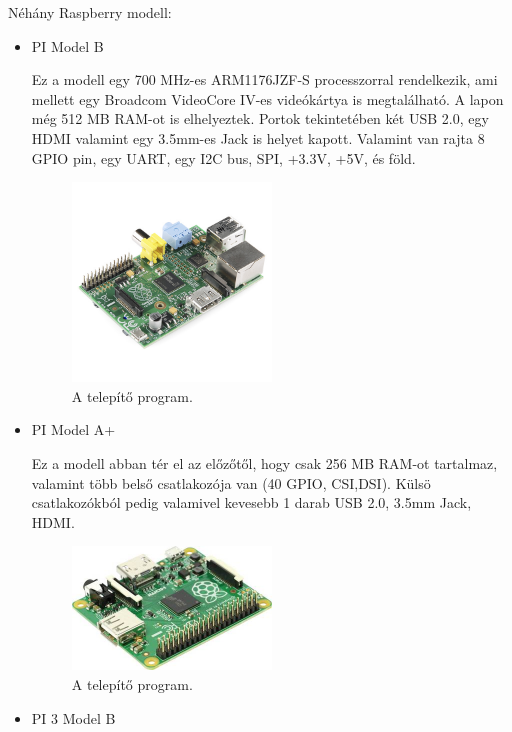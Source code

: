 \documentclass[a4paper,12pt,oneside]{report}
\begin{document}
Néhány Raspberry modell:
\begin{itemize}

	\item{PI Model B}

	Ez a modell egy 700 MHz-es ARM1176JZF-S processzorral rendelkezik, ami mellett egy Broadcom VideoCore IV-es videókártya is
	megtalálható. A lapon még 512 MB RAM-ot is elhelyeztek. Portok tekintetében két USB 2.0, egy HDMI valamint egy 3.5mm-es Jack
	is helyet kapott. Valamint van rajta 8 GPIO pin, egy UART, egy I2C bus, SPI, +3.3V, +5V, és föld.
	\begin{figure}[htbp]
		\centering
		\includegraphics[width=0.5\textwidth]{fig/modelb.png}
		\caption{A telepítő program.}
		\label{fig-modelb}
	\end{figure}
		
	\item{PI Model A+}

	Ez a modell abban tér el az előzőtől, hogy csak 256 MB RAM-ot tartalmaz, valamint több belső csatlakozója van (40 GPIO, CSI,DSI).
	Külsö csatlakozókból pedig valamivel kevesebb 1 darab USB 2.0, 3.5mm Jack, HDMI.
	\begin{figure}[htbp]
		\centering
		\includegraphics[width=0.5\textwidth]{fig/aplusz.png}
		\caption{A telepítő program.}
		\label{fig-aplusz}
	\end{figure}
		
	\item{PI 3 Model B}


\end{itemize}
\end{document}
